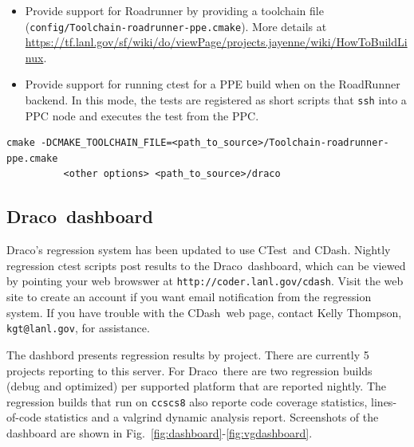 \documentclass[note]{ResearchNote_pdf}
\newcommand{\draco}{Draco}
\newcommand{\ctest}{\textsf{CTest}}
\newcommand{\cdash}{\textsf{CDash}}
\begin{document}
\begin{itemize}
\item Provide support for \textsf{Roadrunner} by providing a toolchain file
  (\texttt{config/Toolchain-roadrunner-ppe.cmake}).  More details at
  \url{https://tf.lanl.gov/sf/wiki/do/viewPage/projects.jayenne/wiki/HowToBuildLinux}.
\item Provide support for running ctest for a PPE build when on the
  RoadRunner backend.  In this mode, the tests are registered as short
  scripts that \texttt{ssh} into a PPC node and executes the test from
  the PPC. 
\end{itemize}
\begin{lstlisting}[xleftmargin=0.50in, xrightmargin=0.50in]
cmake -DCMAKE_TOOLCHAIN_FILE=<path_to_source>/Toolchain-roadrunner-ppe.cmake
          <other options> <path_to_source>/draco
\end{lstlisting}



\subsection{\draco\ dashboard}
\label{sec:dracodash}
\draco's regression system has been updated to use \ctest\ and \cdash.
Nightly regression ctest scripts post results to the
\draco\ dashboard, which can be viewed by pointing your web browswer
at \texttt{http://coder.lanl.gov/cdash}.  Visit the web site to create
an account if you want email notification from the regression system.
If you have trouble with the \cdash\ web page, contact Kelly Thompson,
\texttt{kgt@lanl.gov}, for assistance.

The dashbord presents regression results by project.  There are
currently 5 projects reporting to this server.  For \draco\ there are
two regression builds (debug and optimized) per supported platform
that are reported nightly.  The regression builds that run on
\texttt{ccscs8} also reporte code coverage statistics, lines-of-code
statistics and a valgrind dynamic analysis report.  Screenshots of
the dashboard are shown in
Fig.~\ref{fig:dashboard}-\ref{fig:vgdashboard}. 
\end{document}
